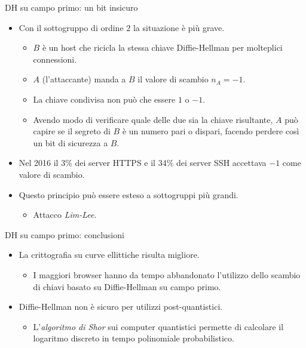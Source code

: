 \documentclass[11pt,svgnames,smaller,aspectratio=169,italian]{beamer}
\begin{document}
\begin{frame}{DH su campo primo: un bit insicuro}
	\begin{itemize}
		\item Con il sottogruppo di ordine $2$ la situazione è più grave.
			\begin{itemize}
				\item $B$ è un host che ricicla la stessa chiave Diffie-Hellman per molteplici connessioni.
				\item $A$ (l'attaccante) manda a $B$ il valore di scambio $n_{A} = -1$.
				\item La chiave condivisa non può che essere $1$ o $-1$.
				\item Avendo modo di verificare quale delle due sia la chiave risultante, $A$ può capire se il segreto di $B$ è un numero pari o dispari, facendo perdere così un bit di sicurezza a $B$.
			\end{itemize}
		\item Nel 2016 il 3\% dei server HTTPS e il 34\% dei server SSH accettava $-1$ come valore di scambio.
		\item Questo principio può essere esteso a sottogruppi più grandi.
			\begin{itemize}
				\item Attacco \emph{Lim-Lee}. %
			\end{itemize}
	\end{itemize}
\end{frame}


\begin{frame}{DH su campo primo: conclusioni}
	\begin{itemize}
		\item La crittografia su curve ellittiche risulta migliore.
			\begin{itemize}
				\item I maggiori browser hanno da tempo abbandonato l'utilizzo dello scambio di chiavi basato su Diffie-Hellman su campo primo.
			\end{itemize}
		\item Diffie-Hellman non è sicuro per utilizzi post-quantistici.
			\begin{itemize}
				\item L'\emph{algoritmo di Shor} sui computer quantistici permette di calcolare il logaritmo discreto in tempo polinomiale probabilistico.
			\end{itemize}
	\end{itemize}
\end{frame}
\end{document}
